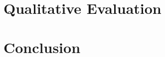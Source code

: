 \documentclass{../llncs2e/llncs}
\begin{document}
\section{Qualitative Evaluation}
\label{sec:qualitative_evaluation}
\section{Conclusion}
\label{sec:conclusion}
%
%
\end{document}
